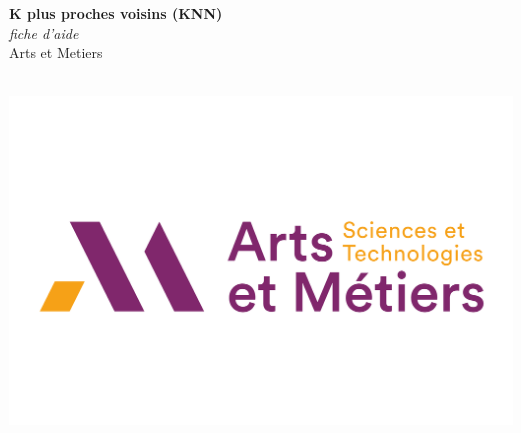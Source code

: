 \documentclass[a0,portrait]{a0poster}
\begin{document}


\begin{minipage}[b]{0.75\linewidth}
\veryHuge \color{NavyBlue} \textbf{K plus proches voisins (KNN)} \color{Black}\\ %
\Huge\textit{fiche d'aide}\\[2cm] %
\huge Arts et Metiers\\[0.4cm] %
\\
\end{minipage}
%
\begin{minipage}[b]{0.25\linewidth}
\includegraphics[width=20cm]{logo.png}\\
\end{minipage}

\vspace{1cm} %


\end{document}
